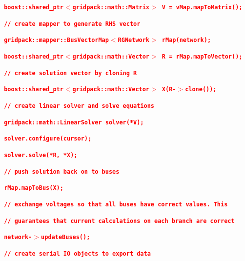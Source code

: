 \documentclass[12pt]{report} %
\begin{document}
\textcolor{red}{\texttt{\textbf{  boost::shared\_ptr$\boldsymbol{\mathrm{<}}$gridpack::math::Matrix$\boldsymbol{\mathrm{>}}$ V = vMap.mapToMatrix();}}}

\textcolor{red}{\texttt{\textbf{}}}

\textcolor{red}{\texttt{\textbf{  // create mapper to generate RHS vector}}}

\textcolor{red}{\texttt{\textbf{  gridpack::mapper::BusVectorMap$\boldsymbol{\mathrm{<}}$RGNetwork$\boldsymbol{\mathrm{>}}$ rMap(network);}}}

\textcolor{red}{\texttt{\textbf{  boost::shared\_ptr$\boldsymbol{\mathrm{<}}$gridpack::math::Vector$\boldsymbol{\mathrm{>}}$ R = rMap.mapToVector();}}}

\textcolor{red}{\texttt{\textbf{}}}

\textcolor{red}{\texttt{\textbf{  // create solution vector by cloning R}}}

\textcolor{red}{\texttt{\textbf{  boost::shared\_ptr$\boldsymbol{\mathrm{<}}$gridpack::math::Vector$\boldsymbol{\mathrm{>}}$ X(R-$\boldsymbol{\mathrm{>}}$clone());}}}

\textcolor{red}{\texttt{\textbf{}}}

\textcolor{red}{\texttt{\textbf{  // create linear solver and solve equations}}}

\textcolor{red}{\texttt{\textbf{  gridpack::math::LinearSolver solver(*V);}}}

\textcolor{red}{\texttt{\textbf{  solver.configure(cursor);}}}

\textcolor{red}{\texttt{\textbf{  solver.solve(*R, *X);}}}

\textcolor{red}{\texttt{\textbf{}}}

\textcolor{red}{\texttt{\textbf{  // push solution back on to buses}}}

\textcolor{red}{\texttt{\textbf{  rMap.mapToBus(X);}}}

\textcolor{red}{\texttt{\textbf{}}}

\textcolor{red}{\texttt{\textbf{  // exchange voltages so that all buses have correct values. This}}}

\textcolor{red}{\texttt{\textbf{  // guarantees that current calculations on each branch are correct}}}

\textcolor{red}{\texttt{\textbf{  network-$\boldsymbol{\mathrm{>}}$updateBuses();}}}

\textcolor{red}{\texttt{\textbf{}}}

\textcolor{red}{\texttt{\textbf{  // create serial IO objects to export data}}}
\end{document}
